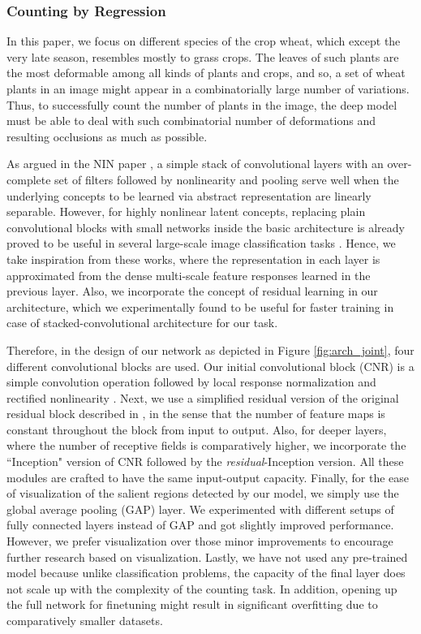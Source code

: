 \documentclass[10pt,twocolumn,letterpaper]{article}
\begin{document}
\subsubsection{Counting by Regression}

In this paper, we focus on different species of the crop wheat, which except the very late season, resembles mostly to grass crops. The leaves of such plants are the most deformable among all kinds of plants and crops, and so, a set of wheat plants in an image might appear in a combinatorially large number of variations. Thus, to successfully count the number of plants in the image, the deep model must be able to deal with such combinatorial number of deformations and resulting occlusions as much as possible.

As argued in the NIN paper \cite{nin}, a simple stack of convolutional layers with an over-complete set of filters followed by nonlinearity and pooling serve well when the underlying concepts to be learned via abstract representation are linearly separable. However, for highly nonlinear latent concepts, replacing plain convolutional blocks with small networks inside the basic architecture is already proved to be useful in several large-scale image classification tasks \cite{inception-01, inception-02}. Hence, we take inspiration from these works, where the representation in each layer is approximated from the dense multi-scale feature responses learned in the previous layer.  Also, we incorporate the concept of residual learning \cite{resnet} in our architecture, which we experimentally found to be useful for faster training in case of stacked-convolutional architecture for our task.

Therefore, in the design of our network as depicted in Figure \ref{fig:arch_joint}, four different convolutional blocks are used. Our initial convolutional block (CNR) is a simple convolution operation followed by local response normalization and rectified nonlinearity \cite{alexnet}. Next, we use a simplified residual version of the original residual block described in \cite{resnet}, in the sense that the number of feature maps is constant throughout the block from input to output. Also, for deeper layers, where the number of receptive fields is comparatively higher, we incorporate the ``Inception" version of CNR followed by the \textit{residual}-Inception version. All these modules are crafted to have the same input-output capacity.  Finally, for the ease of visualization of the salient regions detected by our model, we simply use the global average pooling (GAP) \cite{nin} layer. We experimented with different setups of fully connected layers instead of GAP and got slightly improved performance. However, we prefer visualization over those minor improvements to encourage further research based on visualization. Lastly, we have not used any pre-trained model because unlike classification problems, the capacity of the final layer does not scale up with the complexity of the counting task. In addition, opening up the full network for finetuning might result in significant overfitting due to comparatively smaller datasets.
\end{document}

